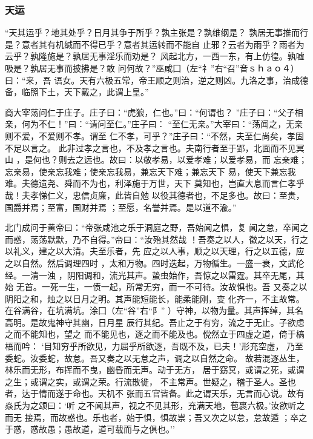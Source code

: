 \documentclass[]{article}
\begin{document}
\hypertarget{header-n762}{%
\subsubsection{天运}\label{header-n762}}

``天其运乎？地其处乎？日月其争于所乎？孰主张是？孰维纲是？
孰居无事推而行是？意者其有机缄而不得已乎？意者其运转而不能自
止邪？云者为雨乎？雨者为云乎？孰隆施是？孰居无事淫乐而劝是？
风起北方，一西一东，有上仿徨。孰嘘吸是？孰居无事而披拂是？敢
问何故？''巫咸囗（左``礻''右``召''音ｓｈａｏ４）曰：``来，吾
语女。天有六极五常，帝王顺之则治，逆之则凶。九洛之事，治成德
备，临照下土，天下戴之，此谓上皇。''

商大宰荡问仁于庄子。庄子曰：``虎狼，仁也。''曰：``何谓也？
''庄子曰：``父子相亲，何为不仁！''曰：``请问至仁。''庄子曰：
``至仁无亲。''大宰曰：``荡闻之，无亲则不爱，不爱则不孝。谓至
仁不孝，可乎？''庄子曰：``不然，夫至仁尚矣，孝固不足以言之。
此非过孝之言也，不及孝之言也。夫南行者至于郢，北面而不见冥山
，是何也？则去之远也。故曰：以敬孝易，以爱孝难；以爱孝易，而
忘亲难；忘亲易，使亲忘我难；使亲忘我易，兼忘天下难；兼忘天下
易，使天下兼忘我难。夫德遗尧、舜而不为也，利泽施于万世，天下
莫知也，岂直大息而言仁孝乎哉！夫孝悌仁义，忠信贞廉，此皆自勉
以役其德者也，不足多也。故曰：至贵，国爵并焉；至富，国财并焉
；至愿，名誉并焉。是以道不渝。''

北门成问于黄帝曰：``帝张咸池之乐于洞庭之野，吾始闻之惧，复
闻之怠，卒闻之而惑，荡荡默默，乃不自得。''帝曰：``汝殆其然哉
！吾奏之以人，徵之以天，行之以礼义，建之以大清。夫至乐者，先
应之以人事，顺之以天理，行之以五德，应之以自然。然后调理四时
，太和万物。四时迭起，万物循生。一盛一衰，文武伦经。一清一浊
，阴阳调和，流光其声。蛰虫始作，吾惊之以雷霆。其卒无尾，其始
无首。一死一生，一偾一起，所常无穷，而一不可待。汝故惧也。吾
又奏之以阴阳之和，烛之以日月之明。其声能短能长，能柔能刚，变
化齐一，不主故常。在谷满谷，在坑满坑。涂囗（左``谷''右``阝''
）守神，以物为量。其声挥绰，其名高明。是故鬼神守其幽，日月星
辰行其纪。吾止之于有穷，流之于无止。子欲虑之而不能知也，望之
而不能见也，逐之而不能及也。傥然立于四虚之道，倚于槁梧而吟：
`目知穷乎所欲见，力屈乎所欲逐，吾既不及，已夫！'形充空虚，
乃至委蛇。汝委蛇，故怠。吾又奏之以无怠之声，调之以自然之命。
故若混逐丛生，林乐而无形，布挥而不曳，幽昏而无声。动于无方，
居于窈冥，或谓之死，或谓之生；或谓之实，或谓之荣。行流散徙，
不主常声。世疑之，稽于圣人。圣也者，达于情而遂于命也。天机不
张而五官皆备。此之谓天乐，无言而心说。故有焱氏为之颂曰：`听
之不闻其声，视之不见其形，充满天地，苞裹六极。'汝欲听之而无
接焉，而故惑也。乐也者，始于惧，惧故祟；吾又次之以怠，怠故遁
；卒之于惑，惑故愚；愚故道，道可载而与之俱也。''
\end{document}
